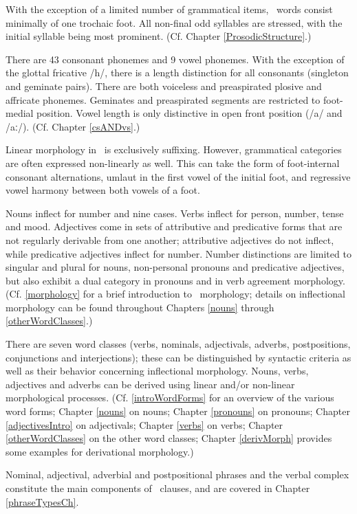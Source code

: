 With the exception of a limited number of grammatical items, \PS\ words consist minimally of one trochaic foot. All non-final odd syllables are stressed, with the initial syllable being most prominent. (Cf. Chapter \ref{ProsodicStructure}.) 

There are 43 consonant phonemes and 9 vowel phonemes. With the exception of the glottal fricative /h/, there is a length distinction for all consonants (singleton and geminate pairs). There are both voiceless and preaspirated plosive and affricate phonemes. Geminates and preaspirated segments are restricted to foot-medial position. Vowel length is only distinctive in open front position (/a/ and /aː/). (Cf. Chapter \ref{csANDvs}.) 

Linear morphology in \PS\ is exclusively suffixing. However, grammatical categories are often expressed non-linearly as well. This can take the form of foot-internal consonant alternations, umlaut in the first vowel of the initial foot, and regressive vowel harmony between both vowels of a foot. 

Nouns inflect for number and nine cases. Verbs inflect for person, number, tense and mood. Adjectives come in sets of attributive and predicative forms that are not regularly derivable from one another; attributive adjectives do not inflect, while predicative adjectives inflect for number. Number distinctions are limited to singular and plural for nouns, non-personal pronouns and predicative adjectives, but also exhibit a dual category in pronouns and in verb agreement morphology. (Cf. \SEC\ref{morphology} for a brief introduction to \PS\ morphology; details on inflectional morphology can be found throughout Chapters \ref{nouns} through \ref{otherWordClasses}.) 

There are seven word classes (verbs, nominals, adjectivals, adverbs, postpositions, conjunctions and interjections); these can be distinguished by syntactic criteria as well as their behavior concerning inflectional morphology. Nouns, verbs, adjectives and adverbs can be derived using linear and/or non-linear morphological processes. (Cf. \SEC\ref{introWordForms} for an  overview of the various word forms; Chapter \ref{nouns} on nouns; Chapter \ref{pronouns} on pronouns; Chapter \ref{adjectivesIntro} on adjectivals; Chapter \ref{verbs} on verbs; Chapter \ref{otherWordClasses} on the other word classes; Chapter \ref{derivMorph} provides some examples for derivational morphology.) 

Nominal, adjectival, adverbial and postpositional phrases and the verbal complex constitute the main components of \PS\ clauses, and are covered in Chapter \ref{phraseTypesCh}. 

